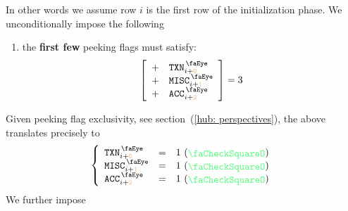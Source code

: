 \begin{center}
\end{center}
In other words we assume row $i$ is the first row of the initialization phase.
We unconditionally impose the following
\begin{enumerate}
	\item 
		\label{hub: initialization phase: the first rows are misc and transaction rows}
		the \textbf{first few} peeking flags must satisfy:
		\[
			\left[ \begin{array}{cl}
				+ & \peekTransaction _{i + \roffTxInitTxn}      \\
				+ & \peekMisc        _{i + \roffTxInitMisc}     \\
				+ & \peekAccount     _{i + \roffTxInitWarmCoinbase} \\
			\end{array} \right]
			= 3
		\]
\end{enumerate}
Given peeking flag exclusivity,
see section~(\ref{hub: perspectives}),
the above translates precisely to
\[
	\left\{ \begin{array}{lcl}
		\peekTransaction _{i + \roffTxInitTxn}          & = & 1 ~ (\sanityCheck) \\
		\peekMisc        _{i + \roffTxInitMisc}         & = & 1 ~ (\sanityCheck) \\
		\peekAccount     _{i + \roffTxInitWarmCoinbase} & = & 1 ~ (\sanityCheck) \\
	\end{array} \right.
\]
We further impose
